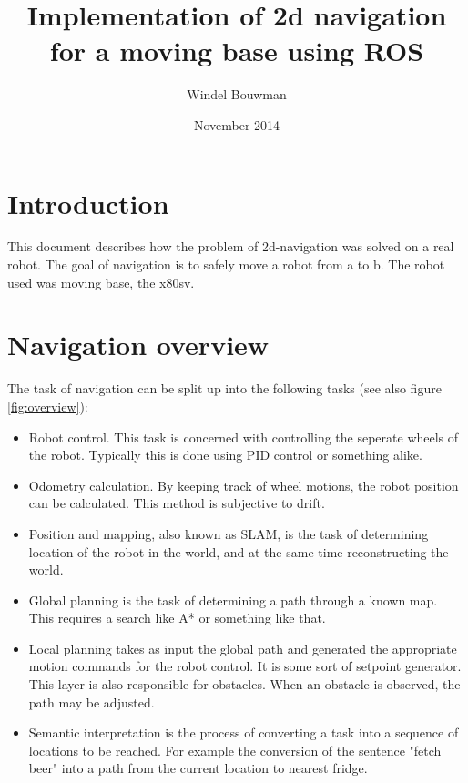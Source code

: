 \documentclass[a4paper]{article}
\begin{document}
\title{Implementation of 2d navigation for a moving base using ROS}
\date{November 2014}
\author{Windel Bouwman}

\maketitle

\tableofcontents

\clearpage

\section{Introduction}

This document describes how the problem of 2d-navigation was solved on a real robot.
The goal of navigation is to safely move a robot from a to b. The robot used
was moving base, the x80sv.

\section{Navigation overview}

The task of navigation can be split up into the following tasks (see also figure \ref{fig:overview}):

\begin{itemize}
  \item Robot control. This task is concerned with controlling the seperate wheels of the robot. Typically this is done using PID control or something alike.
  \item Odometry calculation. By keeping track of wheel motions, the robot position can be
calculated. This method is subjective to drift.
  \item Position and mapping, also known as SLAM, is the task of determining location of the robot in the world, and at the same time reconstructing the world.
  \item Global planning is the task of determining a path through a known map. This requires a search like A* or something like that.
  \item Local planning takes as input the global path and generated the appropriate motion commands for the robot control. It is some sort of setpoint generator. This layer is also responsible for obstacles. When an obstacle is observed, the path may be adjusted.
  \item Semantic interpretation is the process of converting a task into a sequence of locations to be reached. For example the conversion of the sentence "fetch beer" into a path from the current location to nearest fridge.
\end{itemize}
\end{document}
